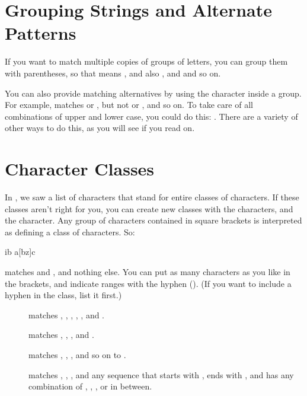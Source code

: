 \documentclass{dods-book}
\begin{document}
\section{Grouping Strings and Alternate Patterns}

If you want to match multiple copies of groups of letters, you can
group them with parentheses, so that  means ,
and also , and  and so on.

You can also provide matching alternatives by using the \lit{|}
character inside a group.  For example,  matches
 or , but not  or , and so
on.  To take care of all combinations of upper and lower case, you
could do this: .  There are a variety of
other ways to do this, as you will see if you read on.


\section{Character Classes}
\label{classes}

In , we saw a list of characters that
stand for entire classes of characters.  If these classes aren't right
for you, you can create new classes with the \lit{[]} characters, and
the \lit{\^{}} character.  Any group of characters contained in square
brackets is interpreted as defining a class of characters.  So:

\begin{vcode}{ib}
a[bz]c
\end{vcode}

matches  and , and nothing else.  You can put as
many characters as you like in the brackets, and indicate ranges with
the hyphen (\lit{-}).  (If you want to include a hyphen in the class,
list it first.)

\begin{description}
\item[] matches , , ,
  , , and .

\item[] matches , , , and
  . 
  
\item[] matches , , , and so
  on to .

\item[] matches , , , and any
  sequence that starts with , ends with , and has any
  combination of , , , or  in between.
\end{description}
\end{document}
